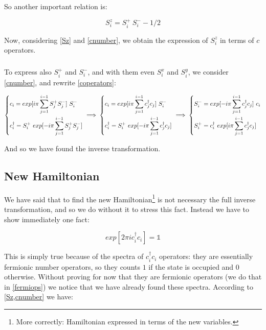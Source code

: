 \documentclass[a4paper,10pt]{article}
\begin{document}
So another important relation is:

\begin{equation}
S_i^z = S_i^+~S_i^- - 1/2
\label{Sz}
\end{equation}

\noindent Now, considering \cref{Sz} and \cref{cnumber}, we obtain the expression of $S_i^z$ in terms of $c$ operators.

\subparagraph{}To express also $S_i^+$ and $S_i^-$, and with them even $S_i^x$ and $S_i^y$, we consider \cref{cnumber}, and rewrite \cref{coperators}:

\begin{equation*}
\begin{dcases}
c_i = exp[i\pi \sum_{j=1}^{i-1} S_j^+ S_j^-]~S_i^-\\
c_i^\dagger = S_i^+~exp[-i\pi \sum_{j=1}^{i-1} S_j^+ S_j^-]
\end{dcases}
\implies
\begin{dcases}
c_i = exp[i\pi \sum_{j=1}^{i-1} c_j^\dagger c_j]~S_i^-\\
c_i^\dagger = S_i^+~exp[-i\pi \sum_{j=1}^{i-1} c_j^\dagger c_j]
\end{dcases}
\implies
\begin{dcases}
S_i^- = exp[-i\pi \sum_{j=1}^{i-1} c_j^\dagger c_j]~c_i\\
S_i^+ = c_i^\dagger ~exp[i\pi \sum_{j=1}^{i-1} c_j^\dagger c_j]
\end{dcases}
\end{equation*}

\noindent And so we have found the inverse transformation.

\subsection{New Hamiltonian}

We have said that to find the new Hamiltonian\footnote{More correctly: Hamiltonian expressed in terms of the new variables.} is not necessary the full inverse transformation, and so we do without it to stress this fact. Instead we have to show immediately one fact:

\begin{equation}
exp[2\pi i c_i^\dagger c_i] = \mathbb{1}
\label{fact1}
\end{equation}

This is simply true because of the spectra of $c_i^\dagger c_i$ operators: they are essentially fermionic number operators, so they counts $1$ if the state is occupied and $0$ otherwise. Without proving for now that they are fermionic operators (we do that in \cref{fermiops}) we notice that we have already found these spectra. According to \cref{Sz,cnumber} we have:
\end{document}
